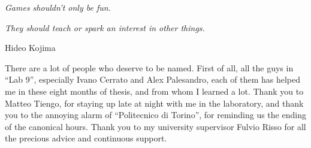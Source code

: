 \documentclass[12pt,classica, italian]{toptesi}
\begin{document}

\frontmatter
\begin{comment}
\vspace*{\stretch{1}}
\begin{flushright}
\noindent
grazie a tutti
\end{flushright}
\vspace*{\stretch{6}}
\cleardoublepage
\end{comment}
\begin{flushright}
\noindent


\textit{Games shouldn't only be fun.} 
	
\textit{They should teach or spark an interest in other things.}

Hideo Kojima
\end{flushright}
\cleardoublepage

%

\setcounter{secnumdepth}{4}
\setcounter{tocdepth}{3}
\newcommand{\servecitazione}[1]{\textcolor{blue}{\textbf{citare qualcosa : #1}}}
\newcommand{\needsrevision}[1] {\textcolor{green}{\textbf{needs revision: #1}}}
\newcommand{\matteo}[1] {\textcolor{green}{\textbf{Matteo: #1}}}
\newcommand{\matteodubbio}[1] {\textcolor{red}{\textbf{questa Matteo non l'ha capita "#1"}}}
\newcommand{\fabiodubbio}[1] {\textcolor{red}{\textbf{Fabio non riesce a capire perche' ha scritto queste vaccate "#1"}}}
\newcommand{\imageneeded}[1] {\textcolor{blue}{\textbf{Image is needed "#1"}}}
\newcommand{\fabio}[1] {\textcolor{green}{\textbf{Fabio: #1}}}

\newcommand{\manclass}[1]{\emph {#1} }


\ringraziamenti
There are a lot of people who deserve to be named. First of all, all the guys in ``Lab 9'', especially Ivano Cerrato and Alex Palesandro, each of them has helped me in these eight months of thesis, and from whom I learned a lot. Thank you to Matteo Tiengo, for staying up late at night with me in the laboratory, and thank you to the annoying alarm of ``Politecnico di Torino'', for reminding us the ending of the canonical hours. Thank you to my university supervisor Fulvio Risso for all the precious advice and continuous support. 
\end{document}
